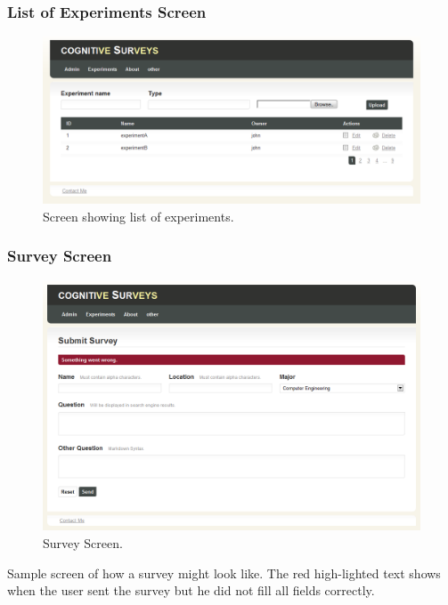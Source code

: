 \documentclass[a4paper,12pt,oneside]{report}
\begin{document}
\subsubsection{List of Experiments Screen}
\begin{figure}[hp!!]
  \begin{center}
   \includegraphics[width=14cm]{pics/experiments.png}
  \end{center}
\caption{Screen showing list of experiments.}
\end{figure}

\newpage
\subsubsection{Survey Screen}
\begin{figure}[h!!]
  \begin{center}
   \includegraphics[width=14cm]{pics/survey.png}
  \end{center}
\caption{Survey Screen.}

\end{figure}
\vskip 1cm
Sample screen of how a survey might look like. The red high-lighted text shows when the user sent the survey but he did not fill all fields correctly.
\end{document}
